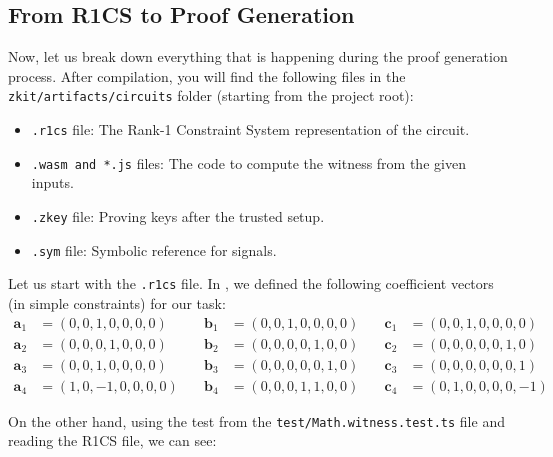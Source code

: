 \documentclass[../lecture-notes.tex]{subfiles}
\begin{document}
    \subsection{From R1CS to Proof Generation}

    Now, let us break down everything that is happening during the proof
    generation process. After compilation, you will find the following files in
    the \texttt{zkit/artifacts/circuits} folder (starting from the project
    root):
    \begin{itemize}
        \item \texttt{.r1cs} file: The Rank-1 Constraint System representation of the circuit.
        \item \texttt{.wasm and *.js} files: The code to compute the witness from the given inputs.
        \item \texttt{.zkey} file: Proving keys after the trusted setup.
        \item \texttt{.sym} file: Symbolic reference for signals.
    \end{itemize}

    Let us start with the \texttt{.r1cs} file. In ,
    we defined the following coefficient vectors (in simple constraints) for our
    task:
    \begin{align*}
        \mathbf{a}_1 &= (0, 0, 1, 0, 0, 0, 0) & \quad \mathbf{b}_1 &= (0, 0, 1, 0, 0, 0, 0) & \quad \mathbf{c}_1 &= (0, 0, 1, 0, 0, 0, 0) \\
        \mathbf{a}_2 &= (0, 0, 0, 1, 0, 0, 0) & \quad \mathbf{b}_2 &= (0, 0, 0, 0, 1, 0, 0) & \quad \mathbf{c}_2 &= (0, 0, 0, 0, 0, 1, 0) \\
        \mathbf{a}_3 &= (0, 0, 1, 0, 0, 0, 0) & \quad \mathbf{b}_3 &= (0, 0, 0, 0, 0, 1, 0) & \quad \mathbf{c}_3 &= (0, 0, 0, 0, 0, 0, 1) \\
        \mathbf{a}_4 &= (1, 0, -1, 0, 0, 0, 0) & \quad \mathbf{b}_4 &= (0, 0, 0, 1, 1, 0, 0) & \quad \mathbf{c}_4 &= (0, 1, 0, 0, 0, 0, -1)
    \end{align*}

    On the other hand, using the test from the \texttt{test/Math.witness.test.ts} file and reading the R1CS file, we can see:
\end{document}
